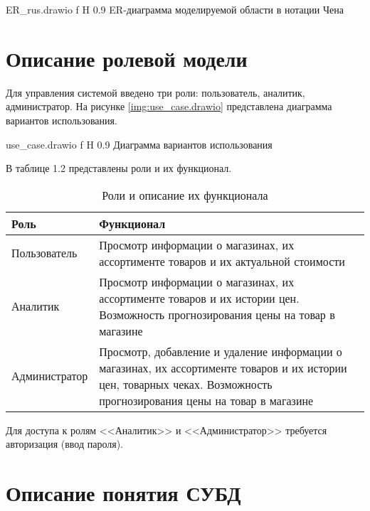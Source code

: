 \documentclass[a4paper]{bmstu}
\begin{document}
	{ER_rus.drawio}
	{f}
	{H}
	{0.9\textwidth}
	{ER-диаграмма моделируемой области в нотации Чена}

\section{Описание ролевой модели}

Для управления системой введено три роли: пользователь, аналитик, администратор. На рисунке \ref{img:use_case.drawio} представлена диаграмма вариантов использования.

	{use_case.drawio}
	{f}
	{H}
	{0.9\textwidth}
	{Диаграмма вариантов использования}

В таблице 1.2 представлены роли и их функционал.

\begin{table}[H]
	\caption{Роли и описание их функционала}
	\begin{center}
		\begin{tabular}{| l | p{12 cm} |} 
			\hline
			
			\textbf{Роль} & \textbf{Функционал} \\  
			
			\hline
			
			Пользователь & Просмотр информации о магазинах, их ассортименте товаров и их актуальной стоимости \\
			
			\hline
			
			Аналитик & Просмотр информации о магазинах, их ассортименте товаров и их истории цен. Возможность прогнозирования цены на товар в магазине \\
			
			\hline
			
			Администратор & Просмотр, добавление и удаление информации о магазинах, их ассортименте товаров и их истории цен, товарных чеках. Возможность прогнозирования цены на товар в магазине \\
			
			\hline
		\end{tabular}
	\end{center}
\end{table}



Для доступа к ролям <<Аналитик>> и <<Администратор>> требуется авторизация (ввод пароля).

\section{Описание понятия СУБД}
\end{document}
